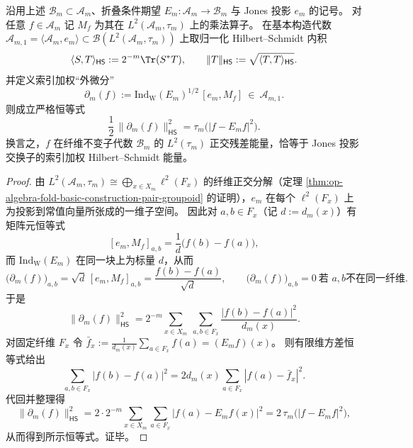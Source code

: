 \begin{proposition}\label{prop:op-algebra-fold-index-weighted-commutator-energy}
沿用上述 \(\mathcal B_m\subset\mathcal A_m\)、折叠条件期望 \(E_m:\mathcal A_m\to\mathcal B_m\) 与 Jones 投影 \(e_m\) 的记号。
对任意 \(f\in\mathcal A_m\) 记 \(M_f\) 为其在 \(L^2(\mathcal A_m,\tau_m)\) 上的乘法算子。
在基本构造代数 \(\mathcal A_{m,1}=\langle\mathcal A_m,e_m\rangle\subset\mathcal B(L^2(\mathcal A_m,\tau_m))\) 上取归一化 Hilbert--Schmidt 内积
\[
\langle S,T\rangle_{\mathsf{HS}}
:=2^{-m}\Tr(S^\ast T),
\qquad
\|T\|_{\mathsf{HS}}:=\sqrt{\langle T,T\rangle_{\mathsf{HS}}}.
\]
并定义索引加权“外微分”
\[
\partial_m(f):=\mathrm{Ind}_{\mathrm W}(E_m)^{1/2}\,[e_m,M_f]\ \in\ \mathcal A_{m,1}.
\]
则成立严格恒等式
\[
\boxed{\;\frac12\,\|\partial_m(f)\|_{\mathsf{HS}}^{2}=\tau_m\!\bigl(|f-E_m f|^2\bigr).\;}
\]
换言之，\(f\) 在纤维不变子代数 \(\mathcal B_m\) 的 \(L^2(\tau_m)\) 正交残差能量，恰等于 Jones 投影交换子的索引加权 Hilbert--Schmidt 能量。
\end{proposition}
\begin{proof}
由 \(L^2(\mathcal A_m,\tau_m)\cong\bigoplus_{x\in X_m}\ell^2(F_x)\) 的纤维正交分解（定理 \ref{thm:op-algebra-fold-basic-construction-pair-groupoid} 的证明），\(e_m\) 在每个 \(\ell^2(F_x)\) 上为投影到常值向量所张成的一维子空间。
因此对 \(a,b\in F_x\)（记 \(d:=d_m(x)\)）有矩阵元恒等式
\[
[e_m,M_f]_{a,b}=\frac{1}{d}\bigl(f(b)-f(a)\bigr),
\]
而 \(\mathrm{Ind}_{\mathrm W}(E_m)\) 在同一块上为标量 \(d\)，从而
\[
\bigl(\partial_m(f)\bigr)_{a,b}=\sqrt d\,[e_m,M_f]_{a,b}=\frac{f(b)-f(a)}{\sqrt d},
\qquad
\bigl(\partial_m(f)\bigr)_{a,b}=0\ \text{若 }a,b\text{不在同一纤维}.
\]
于是
\[
\|\partial_m(f)\|_{\mathsf{HS}}^2
=2^{-m}\sum_{x\in X_m}\ \sum_{a,b\in F_x}\frac{|f(b)-f(a)|^2}{d_m(x)}.
\]
对固定纤维 \(F_x\) 令
\(
\bar f_x:=\frac1{d_m(x)}\sum_{a\in F_x}f(a)=(E_m f)(x)
\)。
则有限维方差恒等式给出
\[
\sum_{a,b\in F_x}|f(b)-f(a)|^2
=2d_m(x)\sum_{a\in F_x}|f(a)-\bar f_x|^2.
\]
代回并整理得
\[
\|\partial_m(f)\|_{\mathsf{HS}}^2
=2\cdot 2^{-m}\sum_{x\in X_m}\sum_{a\in F_x}|f(a)-E_m f(x)|^2
=2\,\tau_m\!\bigl(|f-E_m f|^2\bigr),
\]
从而得到所示恒等式。证毕。
\end{proof}



